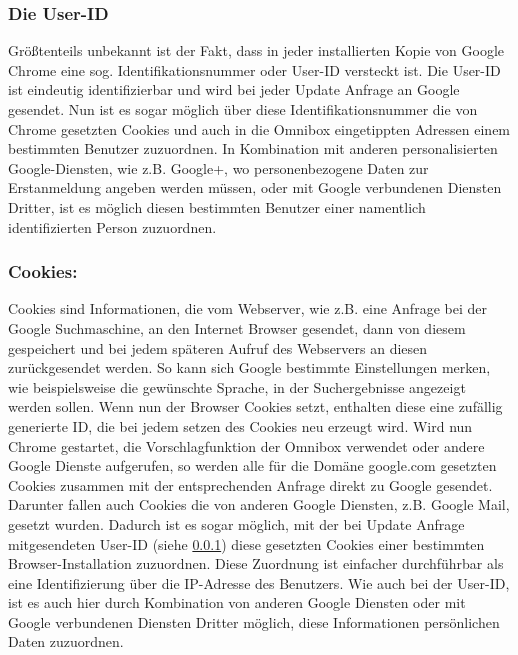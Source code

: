 \documentclass[12pt, a4paper]{llncs}
\begin{document}
	\subsubsection{Die User-ID}
	\label{User-ID}
	Größtenteils unbekannt ist der Fakt, dass in jeder installierten Kopie von Google Chrome eine sog. Identifikationsnummer oder User-ID versteckt ist. Die User-ID ist eindeutig identifizierbar und wird bei jeder Update Anfrage an Google gesendet. Nun ist es sogar möglich über diese Identifikationsnummer die von Chrome gesetzten Cookies und auch in die Omnibox eingetippten Adressen einem bestimmten Benutzer zuzuordnen. In Kombination mit anderen personalisierten Google-Diensten, wie z.B. Google+, wo personenbezogene Daten zur Erstanmeldung angeben werden müssen, oder mit Google verbundenen Diensten Dritter, ist es möglich diesen bestimmten Benutzer einer namentlich identifizierten Person zuzuordnen.
	
	\subsubsection{Cookies:}
	Cookies sind Informationen, die vom Webserver, wie z.B. eine Anfrage bei der Google Suchmaschine, an den Internet Browser gesendet, dann von diesem gespeichert und bei jedem späteren Aufruf des Webservers an diesen zurückgesendet werden. So kann sich Google bestimmte Einstellungen merken, wie beispielsweise die gewünschte Sprache, in der Suchergebnisse angezeigt werden sollen. Wenn nun der Browser Cookies setzt, enthalten diese eine zufällig generierte ID, die bei jedem setzen des Cookies neu erzeugt wird. Wird nun Chrome gestartet, die Vorschlagfunktion der Omnibox verwendet oder andere Google Dienste aufgerufen, so werden alle für die Domäne google.com gesetzten Cookies zusammen mit der entsprechenden Anfrage direkt zu Google gesendet. Darunter fallen auch Cookies die von anderen Google Diensten, z.B. Google Mail, gesetzt wurden. Dadurch ist es sogar möglich, mit der bei Update Anfrage mitgesendeten User-ID (siehe \ref{User-ID}) diese gesetzten Cookies einer bestimmten Browser-Installation zuzuordnen. Diese Zuordnung ist einfacher durchführbar als eine Identifizierung über die IP-Adresse des Benutzers. Wie auch bei der User-ID, ist es auch hier durch Kombination von anderen Google Diensten oder mit Google verbundenen Diensten Dritter möglich, diese Informationen persönlichen Daten zuzuordnen.
	
\end{document}
